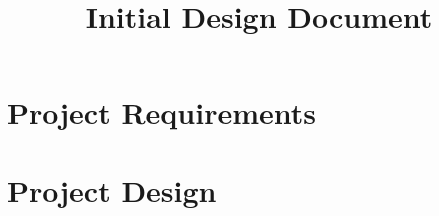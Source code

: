 \documentclass{book}
\title{\ProjectName{} \\ Initial Design Document}
\author{\DocumentAuthor}
\date{\vhCurrentDate}
\begin{document}
\maketitle

\frontmatter



\cleardoublepage{}
\tableofcontents

\mainmatter{}
\part{Project Requirements}\label{part:requirements}





\part{Project Design}%













\appendix{}



\cleardoublepage{}
\printindex

\cleardoublepage{}
\end{document}
